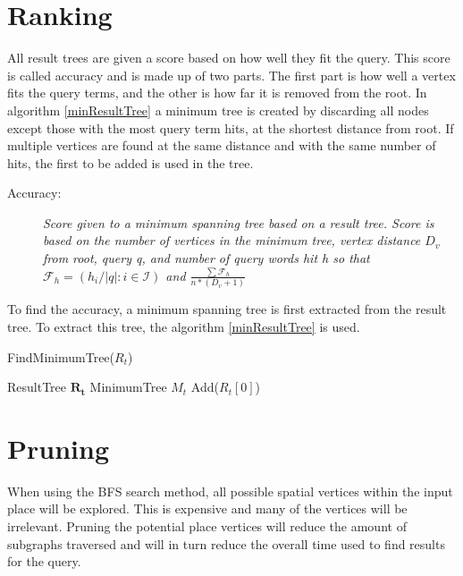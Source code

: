 \section{Ranking}
All result trees are given a score based on how well they fit the query. This score is called accuracy and is made up of two parts. The first part is how well a vertex fits the query terms, and the other is how far it is removed from the root. In algorithm \ref{minResultTree} a minimum tree is created by discarding all nodes except those with the most query term hits, at the shortest distance from root. If multiple vertices are found at the same distance and with the same number of hits, the first to be added is used in the tree.
\begin{description}
    \item[Accuracy:] {\em Score given to a minimum spanning tree based on a result tree. Score is based on the number of vertices  in the minimum tree, vertex distance $D_v$ from root, query q, and number of query words hit h so that $\mathcal{F}_h = (h_i/\left\lvert q \right\rvert : i \in \mathcal{I})$ and $ \frac{\sum \mathcal{F}_h}{n*(D_v+1)}$}
\end{description}
To find the accuracy, a minimum spanning tree is first extracted from the result tree. To extract this tree, the algorithm \ref{minResultTree} is used.
\begin{algorithm}
    \caption{FindMinimumTree($R_t$)}
    \label{minResultTree}
    \SetAlgoLined
    ResultTree $\mathbf{R_t}$\; MinimumTree $M_t$ Add($R_t[0]$)\;
\end{algorithm}

\section{Pruning}
\label{pruning}
When using the BFS search method, all possible spatial vertices within the input place will be explored. This is expensive and many of the vertices will be irrelevant. Pruning the potential place vertices will reduce the amount of subgraphs traversed and will in turn reduce the overall time used to find results for the query.

